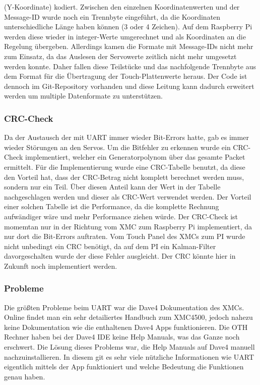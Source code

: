 \documentclass[12pt,a4paper,bibliography=totoc,listof=totoc]{scrartcl}
\begin{document}
(Y-Koordinate) kodiert. Zwischen den einzelnen Koordinatenwerten und der Message-ID wurde noch ein 
Trennbyte eingeführt, da die Koordinaten unterschiedliche Länge haben können (3 oder 4 Zeichen). Auf dem 
Raspberry Pi werden diese wieder in integer-Werte umgerechnet und als Koordinaten an die Regelung 
übergeben.
\newline
Allerdings kamen die Formate mit Message-IDs nicht mehr zum Einsatz, da das Auslesen der Servowerte zeitlich 
nicht mehr umgesetzt werden konnte. Daher fallen diese Teilstücke und das nachfolgende Trennbyte aus dem 
Format für die Übertragung der Touch-Plattenwerte heraus. Der Code ist dennoch im Git-Repository vorhanden 
und diese Leitung kann dadurch erweitert werden um multiple Datenformate zu unterstützen.

\subsubsection{CRC-Check}
Da der Austausch der mit UART immer wieder Bit-Errors hatte, gab es immer wieder Störungen an den Servos.
Um die Bitfehler zu erkennen wurde ein CRC-Check implementiert, welcher ein Generatorpolynom über das
gesamte Packet ermittelt. Für die Implementierung wurde eine CRC-Tabelle benutzt, da diese den Vorteil hat,
dass der CRC-Betrag nicht komplett berechnet werden muss, sondern nur ein Teil. Über diesen Anteil kann 
der Wert in der Tabelle nachgeschlagen werden und dieser als CRC-Wert verwendet werden. Der Vorteil einer solchen
Tabelle ist die Performance, da die komplette Rechnung aufwändiger wäre und mehr Performance ziehen würde. Der CRC-Check ist momemtan nur in
der Richtung vom XMC zum Raspberry Pi implementiert, da nur dort die Bit-Errors auftraten. Vom Touch Panel des XMCs zum PI wurde nicht unbedingt ein CRC benötigt,
da auf dem PI ein Kalman-Filter davorgeschalten wurde der diese Fehler ausgleicht. 
Der CRC könnte hier in Zukunft noch implementiert werden.

\subsubsection{Probleme}
Die größten Probleme beim UART war die Dave4 Dokumentation des XMCs. Online findet man ein sehr detailiertes Handbuch zum 
XMC4500, jedoch nahezu keine Dokumentation wie die enthaltenen Dave4 Apps funktionieren. Die OTH Rechner haben bei der Dave4 IDE keine 
Help Manuals, was das Ganze noch erschwert. Die Lösung dieses Problems war, die Help Manuals auf Dave4 manuell 
nachzuinstallieren. In diesem git es sehr viele nützliche Informationen wie UART eigentlich mittels der App funktioniert und welche Bedeutung die Funktionen genau haben.
\end{document}
